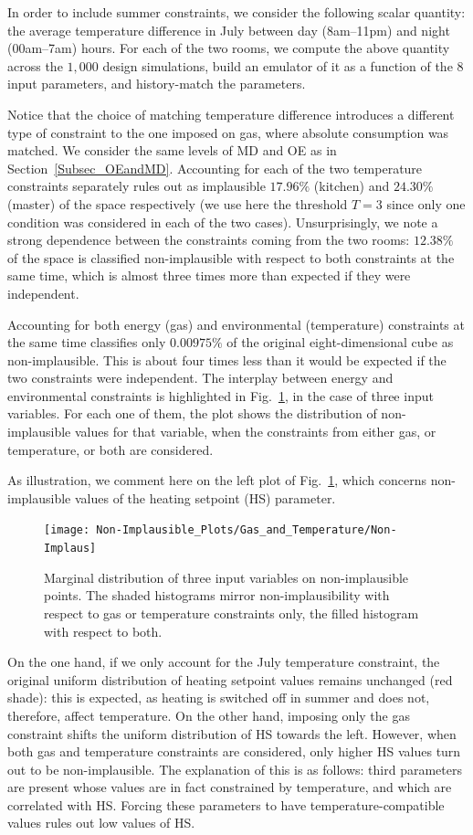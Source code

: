 \documentclass[preprint,12pt, sort&compress]{elsarticle}
\begin{document}
In order to include summer constraints, we consider the following scalar quantity: the average temperature difference in July between day (8am--11pm) and night (00am--7am) hours. For each of the two rooms, we compute the above quantity across the $1,000$ design simulations, build an emulator of it as a function of the 8 input parameters, and history-match the parameters.

Notice that the choice of matching temperature difference introduces a different type of constraint to the one imposed on gas, where absolute consumption was matched. We consider the same levels of MD and OE as in Section~\ref{Subsec_OEandMD}. Accounting for each of the two temperature constraints separately rules out as implausible $17.96\%$ (kitchen) and $24.30\%$ (master) of the space respectively (we use here the threshold $T=3$ since only one condition was considered in each of the two cases). Unsurprisingly, we note a strong dependence between the constraints coming from the two rooms: $12.38\%$ of the space is classified non-implausible with respect to both constraints at the same time, which is almost three times more than expected if they were independent.

Accounting for both energy (gas) and environmental (temperature) constraints at the same time classifies only $0.00975\%$ of the original eight-dimensional cube as non-implausible. This is about four times less than it would be expected if the two constraints were independent. The interplay between energy and environmental constraints is highlighted in Fig.~\ref{Fig_Temp}, in the case of three input variables. For each one of them, the plot shows the distribution of non-implausible values for that variable, when the constraints from either gas, or temperature, or both are considered.

As illustration, we comment here on the left plot of Fig.~\ref{Fig_Temp}, which concerns non-implausible values of the heating setpoint (HS) parameter. 

\begin{figure}
\texttt{[image: Non-Implausible\_Plots/Gas\_and\_Temperature/Non-Implaus]}
\caption{Marginal distribution of three input variables on non-implausible points. The shaded histograms mirror non-implausibility with respect to gas or temperature constraints only, the filled histogram with respect to both.}
\label{Fig_Temp}
\end{figure}

On the one hand, if we only account for the July temperature constraint, the original uniform distribution of heating setpoint values remains unchanged (red shade): this is expected, as heating is switched off in summer and does not, therefore, affect temperature. On the other hand, imposing only the gas constraint shifts the uniform distribution of HS towards the left. However, when both gas and temperature constraints are considered, only higher HS values turn out to be non-implausible. The explanation of this is as follows: third parameters are present whose values are in fact constrained by temperature, and which are correlated with HS. Forcing these parameters to have temperature-compatible values rules out low values of HS. 
\end{document}
